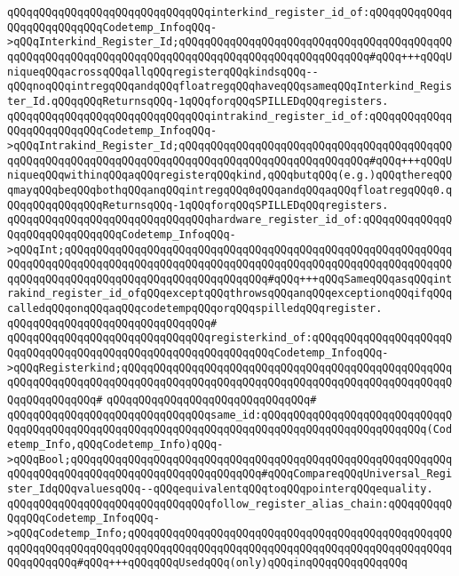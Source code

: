 \verb|qQQqqQQqqQQqqQQqqQQqqQQqqQQqqQQqinterkind_register_id_of:qQQqqQQqqQQqqQQqqQQqqQQqqQQqCodetemp_InfoqQQq->qQQqInterkind_Register_Id;qQQqqQQqqQQqqQQqqQQqqQQqqQQqqQQqqQQqqQQqqQQqqQQqqQQqqQQqqQQqqQQqqQQqqQQqqQQqqQQqqQQqqQQqqQQqqQQqqQQq#qQQq+++qQQqUniqueqQQqacrossqQQqallqQQqregisterqQQqkindsqQQq--qQQqnoqQQqintregqQQqandqQQqfloatregqQQqhaveqQQqsameqQQqInterkind_Register_Id.qQQqqQQqReturnsqQQq-1qQQqforqQQqSPILLEDqQQqregisters.|\newline
\verb|qQQqqQQqqQQqqQQqqQQqqQQqqQQqqQQqintrakind_register_id_of:qQQqqQQqqQQqqQQqqQQqqQQqqQQqCodetemp_InfoqQQq->qQQqIntrakind_Register_Id;qQQqqQQqqQQqqQQqqQQqqQQqqQQqqQQqqQQqqQQqqQQqqQQqqQQqqQQqqQQqqQQqqQQqqQQqqQQqqQQqqQQqqQQqqQQqqQQqqQQq#qQQq+++qQQqUniqueqQQqwithinqQQqaqQQqregisterqQQqkind,qQQqbutqQQq(e.g.)qQQqthereqQQqmayqQQqbeqQQqbothqQQqanqQQqintregqQQq0qQQqandqQQqaqQQqfloatregqQQq0.qQQqqQQqqQQqqQQqReturnsqQQq-1qQQqforqQQqSPILLEDqQQqregisters.|\newline
\verb|qQQqqQQqqQQqqQQqqQQqqQQqqQQqqQQqhardware_register_id_of:qQQqqQQqqQQqqQQqqQQqqQQqqQQqqQQqCodetemp_InfoqQQq->qQQqInt;qQQqqQQqqQQqqQQqqQQqqQQqqQQqqQQqqQQqqQQqqQQqqQQqqQQqqQQqqQQqqQQqqQQqqQQqqQQqqQQqqQQqqQQqqQQqqQQqqQQqqQQqqQQqqQQqqQQqqQQqqQQqqQQqqQQqqQQqqQQqqQQqqQQqqQQqqQQqqQQqqQQqqQQqqQQq#qQQq+++qQQqSameqQQqasqQQqintrakind_register_id_ofqQQqexceptqQQqthrowsqQQqanqQQqexceptionqQQqifqQQqcalledqQQqonqQQqaqQQqcodetempqQQqorqQQqspilledqQQqregister.|\newline
\verb|qQQqqQQqqQQqqQQqqQQqqQQqqQQqqQQq#|\newline
\verb|qQQqqQQqqQQqqQQqqQQqqQQqqQQqqQQqregisterkind_of:qQQqqQQqqQQqqQQqqQQqqQQqqQQqqQQqqQQqqQQqqQQqqQQqqQQqqQQqqQQqqQQqCodetemp_InfoqQQq->qQQqRegisterkind;qQQqqQQqqQQqqQQqqQQqqQQqqQQqqQQqqQQqqQQqqQQqqQQqqQQqqQQqqQQqqQQqqQQqqQQqqQQqqQQqqQQqqQQqqQQqqQQqqQQqqQQqqQQqqQQqqQQqqQQqqQQqqQQqqQQqqQQq#|\newline
\verb|qQQqqQQqqQQqqQQqqQQqqQQqqQQqqQQq#|\newline
\verb|qQQqqQQqqQQqqQQqqQQqqQQqqQQqqQQqsame_id:qQQqqQQqqQQqqQQqqQQqqQQqqQQqqQQqqQQqqQQqqQQqqQQqqQQqqQQqqQQqqQQqqQQqqQQqqQQqqQQqqQQqqQQqqQQqqQQq(Codetemp_Info,qQQqCodetemp_Info)qQQq->qQQqBool;qQQqqQQqqQQqqQQqqQQqqQQqqQQqqQQqqQQqqQQqqQQqqQQqqQQqqQQqqQQqqQQqqQQqqQQqqQQqqQQqqQQqqQQqqQQqqQQqqQQq#qQQqCompareqQQqUniversal_Register_IdqQQqvaluesqQQq--qQQqequivalentqQQqtoqQQqpointerqQQqequality.|\newline
\verb|qQQqqQQqqQQqqQQqqQQqqQQqqQQqqQQqfollow_register_alias_chain:qQQqqQQqqQQqqQQqCodetemp_InfoqQQq->qQQqCodetemp_Info;qQQqqQQqqQQqqQQqqQQqqQQqqQQqqQQqqQQqqQQqqQQqqQQqqQQqqQQqqQQqqQQqqQQqqQQqqQQqqQQqqQQqqQQqqQQqqQQqqQQqqQQqqQQqqQQqqQQqqQQqqQQqqQQqqQQq#qQQq+++qQQqqQQqUsedqQQq(only)qQQqinqQQqqQQqqQQqqQQq|\newline
